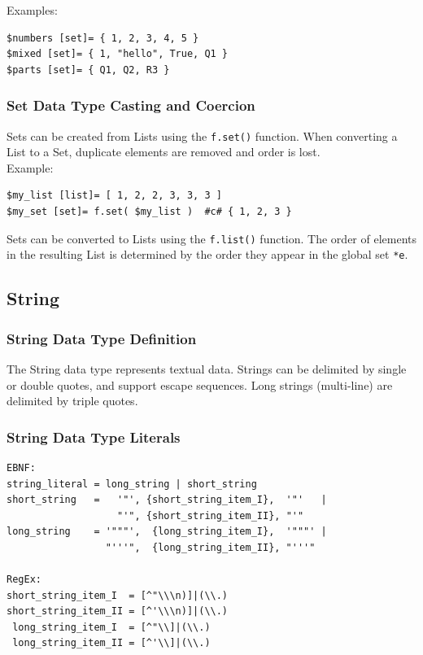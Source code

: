 \documentclass{report}
\begin{document}
Examples:
\begin{verbatim}
$numbers [set]= { 1, 2, 3, 4, 5 }
$mixed [set]= { 1, "hello", True, Q1 }
$parts [set]= { Q1, Q2, R3 }
\end{verbatim}

\subsubsection{Set Data Type Casting and Coercion}
Sets can be created from Lists using the \texttt{f.set()} function. When converting a List to a Set, duplicate elements are removed and order is lost.\\
Example:
\begin{verbatim}
$my_list [list]= [ 1, 2, 2, 3, 3, 3 ]
$my_set [set]= f.set( $my_list )  #c# { 1, 2, 3 }
\end{verbatim}
Sets can be converted to Lists using the \texttt{f.list()} function. The order of elements in the resulting List is determined by the order they appear in the global set \texttt{*e}.
\subsection{String}
\subsubsection{String Data Type Definition}
The String data type represents textual data. Strings can be delimited by single or double quotes, and support escape sequences. Long strings (multi-line) are delimited by triple quotes.
\subsubsection{String Data Type Literals}
\begin{verbatim}
EBNF:
string_literal = long_string | short_string
short_string   =   '"', {short_string_item_I},  '"'   |
                   "'", {short_string_item_II}, "'"
long_string    = '"""',  {long_string_item_I},  '"""' |
                 "'''",  {long_string_item_II}, "'''"

RegEx:
short_string_item_I  = [^"\\\n)]|(\\.)
short_string_item_II = [^'\\\n)]|(\\.)
 long_string_item_I  = [^"\\]|(\\.)
 long_string_item_II = [^'\\]|(\\.)
\end{verbatim}
\end{document}
